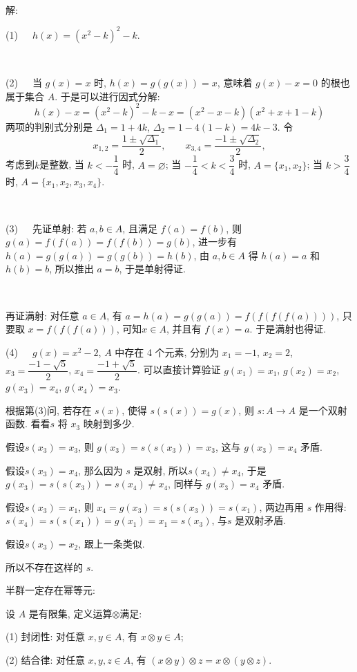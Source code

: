 ~

\noindent 解: 

(1)\ \ \ $h(x) = (x^2-k)^2-k$.

~

(2)\ \ \ 当 $g(x)=x$ 时, $h(x)=g(g(x))=x$, 意味着 $g(x)-x=0$ 的根也属于集合 $A$. 于是可以进行因式分解:
\[ h(x)-x =  (x^2-k)^2-k - x = (x^2-x-k)(x^2+x+1-k) \]
两项的判别式分别是 $\Delta_1 = 1+4k$, $\Delta_2 = 1-4(1-k)=4k-3$. 令
\[x_{1,2}=\frac{1\pm\sqrt{\Delta_1}}{2},\qquad x_{3,4}=\frac{-1\pm\sqrt{\Delta_2}}{2} ,\]
考虑到$k$是整数,
当 $k < -\dfrac{1}{4}$ 时, $A=\varnothing$;
当 $-\dfrac{1}{4} < k < \dfrac{3}{4}$ 时, $A=\{x_1, x_2\}$;
当 $k > \dfrac{3}{4}$ 时, $A=\{x_1, x_2, x_3, x_4\}$.

~

(3)\ \ \ 先证单射: 若 $a,b\in A$, 且满足 $f(a)=f(b)$, 则 $g(a)=f(f(a))=f(f(b))=g(b)$, 进一步有 $h(a)=g(g(a))=g(g(b))=h(b)$, 由 $a,b\in A$ 得 $h(a)=a$ 和 $h(b)=b$, 所以推出 $a=b$, 于是单射得证.

~

再证满射: 对任意 $a\in A$, 有 $a = h(a)=g(g(a))=f(f(f(f(a))))$, 只要取 $x = f(f(f(a)))$, 可知$x\in A$, 并且有 $f(x)=a$. 于是满射也得证.

(4)\ \ \ $g(x)=x^2-2$, $A$ 中存在 4 个元素, 分别为 $x_1 = -1$, $x_2=2$, $x_3=\dfrac{-1-\sqrt{5}}{2}$, $x_4=\dfrac{-1+\sqrt{5}}{2}$. 可以直接计算验证 $g(x_1)=x_1$, $g(x_2)=x_2$, $g(x_3)=x_4$, $g(x_4)=x_3$. 

根据第(3)问, 若存在 $s(x)$, 使得 $s(s(x))=g(x)$, 则 $s: A\rightarrow A$ 是一个双射函数. 看看$s$ 将 $x_3$ 映射到多少. 

假设$s(x_3)=x_3$, 则 $g(x_3)=s(s(x_3))=x_3$, 这与 $g(x_3)=x_4$ 矛盾.

假设$s(x_3)=x_4$, 那么因为 $s$ 是双射, 所以$s(x_4)\ne x_4$, 于是 $g(x_3)=s(s(x_3))=s(x_4)\ne x_4$, 同样与 $g(x_3)=x_4$ 矛盾.

假设$s(x_3)=x_1$, 则 $x_4 = g(x_3)=s(s(x_3))=s(x_1)$, 两边再用 $s$ 作用得: $s(x_4) = s(s(x_1)) = g(x_1)=x_1=s(x_3)$, 与$s$ 是双射矛盾. 

假设$s(x_3)=x_2$, 跟上一条类似.

所以不存在这样的 $s$.


\newpage
\noindent 半群一定存在幂等元:

设 $A$ 是有限集, 定义运算$\otimes$满足:

(1) 封闭性: 对任意 $x,y\in A$, 有 $x\otimes y\in A$;

(2) 结合律: 对任意 $x,y,z\in A$, 有 $(x\otimes y)\otimes z = x\otimes(y\otimes z)$.


